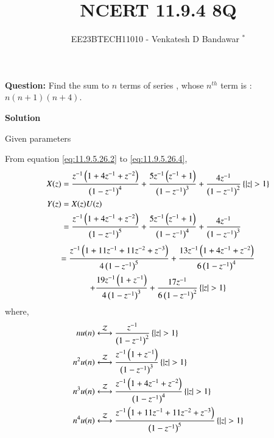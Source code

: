 \documentclass[journal,12pt,twocolumn]{IEEEtran}
\theoremstyle{remark}
\begin{document}

\vspace{3cm}

\title{NCERT 11.9.4 8Q}
\author{EE23BTECH11010 - Venkatesh D Bandawar $^{*}$%
}
\maketitle
\bigskip

\renewcommand{\thefigure}{\theenumi}
\renewcommand{\thetable}{\theenumi}

\textbf{Question:} Find the sum to $n$ terms of series , whose $n^{th}$ term is : $n(n+1)(n+4)$.

\textbf{Solution}
\begin{table}[!h] 
\centering

\caption{Given parameters}
\label{given parameters list}
\end{table}

From equation \eqref{eq:11.9.5.26.2} to \eqref{eq:11.9.5.26.4},\\
    \begin{align}
        X(z) &= \frac{z^{-1}\brak{1+4z^{-1}+z^{-2}}}{\brak{1-z^{-1}}^4} + \frac{5z^{-1}\brak{z^{-1}+1}}{\brak{1-z^{-1}}^3} + \frac{4z^{-1}}{\brak{1-z^{-1}}^2} \cbrak{|z|>1}\\
         Y(z) &= X(z)U(z)\\
         &=\frac{z^{-1}\brak{1+4z^{-1}+z^{-2}}}{\brak{1-z^{-1}}^5} + \frac{5z^{-1}\brak{z^{-1}+1}}{\brak{1-z^{-1}}^4} + \frac{4z^{-1}}{\brak{1-z^{-1}}^3} 
    \end{align}
    \begin{multline}
        = \frac{z^{-1}\brak{1+11z^{-1}+11z^{-2}+z^{-3}}}{4\brak{1-z^{-1}}^5} +\frac{13z^{-1}\brak{1+4z^{-1}+z^{-2}}}{6\brak{1-z^{-1}}^4} \\
        + \frac{19z^{-1}\brak{1+z^{-1}}}{4\brak{1-z^{-1}}^3} + \frac{17z^{-1}}{6\brak{1-z^{-1}}^2} \cbrak{|z|>1}
    \end{multline}
    where,
    \begin{align}
        n u(n) &\system{Z} \frac{z^{-1}}{\brak{1-z^{-1}}^2} \cbrak{|z|>1}\\
        n^2 u(n) &\system{Z} \frac{z^{-1}\brak{1+z^{-1}}}{\brak{1-z^{-1}}^3} \cbrak{|z|>1}\\
        n^3 u(n) &\system{Z} \frac{z^{-1}\brak{1+4z^{-1}+z^{-2}}}{\brak{1-z^{-1}}^4} \cbrak{|z|>1}\\
        n^4 u(n) &\system{Z} \frac{z^{-1}\brak{1+11z^{-1}+11z^{-2}+z^{-3}}}{\brak{1-z^{-1}}^5} \cbrak{|z|>1}
    \end{align}
    
\end{document}
